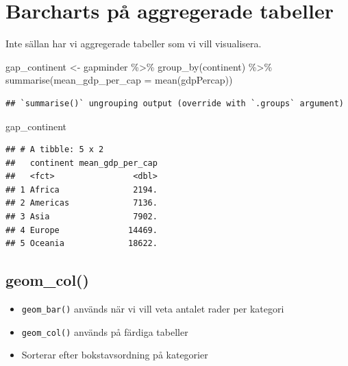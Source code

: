 \documentclass[
]{book}
\newenvironment{Shaded}{\begin{snugshade}}{\end{snugshade}}
\newcommand{\AttributeTok}[1]{\textcolor[rgb]{0.77,0.63,0.00}{#1}}
\newcommand{\FunctionTok}[1]{\textcolor[rgb]{0.00,0.00,0.00}{#1}}
\newcommand{\NormalTok}[1]{#1}
\newcommand{\OtherTok}[1]{\textcolor[rgb]{0.56,0.35,0.01}{#1}}
\newcommand{\SpecialCharTok}[1]{\textcolor[rgb]{0.00,0.00,0.00}{#1}}
\providecommand{\tightlist}{%
  \setlength{\itemsep}{0pt}\setlength{\parskip}{0pt}}
\begin{document}
\hypertarget{barcharts-puxe5-aggregerade-tabeller}{%
\section{Barcharts på aggregerade tabeller}\label{barcharts-puxe5-aggregerade-tabeller}}

Inte sällan har vi aggregerade tabeller som vi vill visualisera.

\begin{Shaded}
\begin{Highlighting}[]
\NormalTok{gap\_continent }\OtherTok{\textless{}{-}}\NormalTok{ gapminder }\SpecialCharTok{\%\textgreater{}\%} 
  \FunctionTok{group\_by}\NormalTok{(continent) }\SpecialCharTok{\%\textgreater{}\%} 
  \FunctionTok{summarise}\NormalTok{(}\AttributeTok{mean\_gdp\_per\_cap =} \FunctionTok{mean}\NormalTok{(gdpPercap))}
\end{Highlighting}
\end{Shaded}

\begin{verbatim}
## `summarise()` ungrouping output (override with `.groups` argument)
\end{verbatim}

\begin{Shaded}
\begin{Highlighting}[]
\NormalTok{gap\_continent}
\end{Highlighting}
\end{Shaded}

\begin{verbatim}
## # A tibble: 5 x 2
##   continent mean_gdp_per_cap
##   <fct>                <dbl>
## 1 Africa               2194.
## 2 Americas             7136.
## 3 Asia                 7902.
## 4 Europe              14469.
## 5 Oceania             18622.
\end{verbatim}

\hypertarget{geom_col}{%
\subsection{geom\_col()}\label{geom_col}}

\begin{itemize}
\tightlist
\item
  \texttt{geom\_bar()} används när vi vill veta antalet rader per kategori
\item
  \texttt{geom\_col()} används på färdiga tabeller
\item
  Sorterar efter bokstavsordning på kategorier
\end{itemize}
\end{document}
